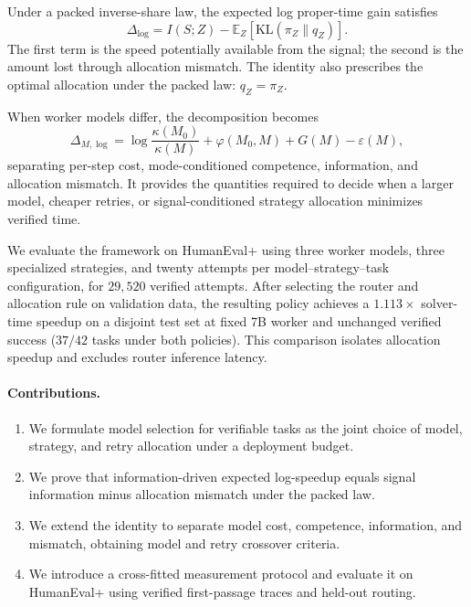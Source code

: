 \documentclass[10pt,twocolumn]{article}
\theoremstyle{paperplain}
\theoremstyle{paperdefinition}
\theoremstyle{paperremark}
\begin{document}
Under a packed inverse-share law, the expected log proper-time gain satisfies
\[
    \Delta_{\log}
    =
    I(S;Z)
    -
    \mathbb E_Z\!\left[
        \mathrm{KL}(\pi_Z\|q_Z)
    \right].
\]
The first term is the speed potentially available from the signal; the second
is the amount lost through allocation mismatch. The identity also prescribes
the optimal allocation under the packed law: $q_Z=\pi_Z$.

When worker models differ, the decomposition becomes
\[
    \Delta_{M,\log}
    =
    \log\frac{\kappa(M_0)}{\kappa(M)}
    +
    \varphi(M_0,M)
    +
    G(M)
    -
    \varepsilon(M),
\]
separating per-step cost, mode-conditioned competence, information, and
allocation mismatch. It provides the quantities required to decide when a
larger model, cheaper retries, or signal-conditioned strategy allocation
minimizes verified time.

We evaluate the framework on HumanEval+ using three worker models, three
specialized strategies, and twenty attempts per model--strategy--task
configuration, for $29{,}520$ verified attempts. After selecting the router
and allocation rule on validation data, the resulting policy achieves a
$1.113\times$ solver-time speedup on a disjoint test set at fixed 7B worker
and unchanged verified success ($37/42$ tasks under both policies). This
comparison isolates allocation speedup and excludes router inference latency.

\paragraph{Contributions.}
\begin{enumerate}
    \item We formulate model selection for verifiable tasks as the joint choice
    of model, strategy, and retry allocation under a deployment budget.

    \item We prove that information-driven expected log-speedup equals signal
    information minus allocation mismatch under the packed law.

    \item We extend the identity to separate model cost, competence,
    information, and mismatch, obtaining model and retry crossover criteria.

    \item We introduce a cross-fitted measurement protocol and evaluate it on
    HumanEval+ using verified first-passage traces and held-out routing.
\end{enumerate}
\end{document}
